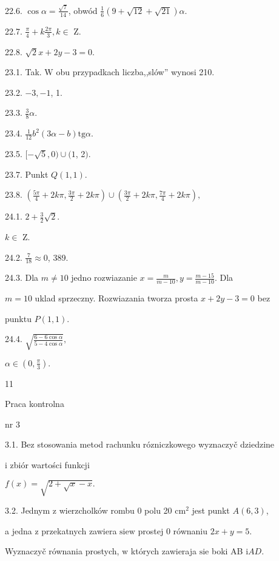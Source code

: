 \documentclass[a4paper,12pt]{article}
\begin{document}
22.6. $\displaystyle \cos\alpha=\frac{\sqrt{7}}{14}$, obwód $\displaystyle \frac{1}{6}(9+\sqrt{12}+\sqrt{21})\alpha.$

22.7. $\displaystyle \frac{\pi}{4}+k\frac{2\pi}{3},  k\in$ Z.

22.8. $\sqrt{2}x+2y-3=0.$

23.1. Tak. $\mathrm{W}$ obu przypadkach liczba,,slów'' wynosi 210.

23.2. $-3, -1$, 1.

23.3. $\displaystyle \frac{3}{8}\alpha.$

23.4. $\displaystyle \frac{1}{12}b^{2}(3\alpha-b)\mathrm{t}\mathrm{g}\alpha.$

23.5. $[-\sqrt{5},0)\cup(1$, 2$).$

23.7. Punkt $Q(1,1).$

23.8. $(\displaystyle \frac{5\pi}{4}+2k\pi,\frac{3\pi}{2}+2k\pi)\cup(\frac{3\pi}{2}+2k\pi,\frac{7\pi}{4}+2k\pi),$

24.1. $2+\displaystyle \frac{3}{2}\sqrt{2}.$

$ k\in$ Z.

24.2. $\displaystyle \frac{7}{18}\approx 0$, 389.

24.3. Dla $ m\neq 10$ jedno rozwiazanie $x= \displaystyle \frac{m}{m-10}, y= \displaystyle \frac{m-15}{m-10}$. Dla

$m= 10$ uklad sprzeczny. Rozwiazania tworza prosta $x+2y-3=0$ bez

punktu $P(1,1).$

24.4. $\sqrt{\frac{6-6\cos\alpha}{5-4\cos\alpha}},$

$\alpha\in (0,\displaystyle \frac{\pi}{3}).$





11

Praca kontrolna

nr 3

3.1. Bez stosowania metod rachunku rózniczkowego wyznaczyč dziedzine

i zbiór wartości funkcji

$f(x)=\sqrt{2+\sqrt{x}-x}.$

3.2. Jednym $\mathrm{z}$ wierzcholków rombu $0$ polu 20 $\mathrm{c}\mathrm{m}^{2}$ jest punkt $A(6,3)$,

a jedna $\mathrm{z}$ przekatnych zawiera $\mathrm{s}\mathrm{i}\mathrm{e}\mathrm{w}$ prostej $0$ równaniu $2x+y=5.$

Wyznaczyč równania prostych, $\mathrm{w}$ których zawieraja $\mathrm{s}\mathrm{i}\mathrm{e}$ boki AB $\mathrm{i}AD.$
\end{document}
